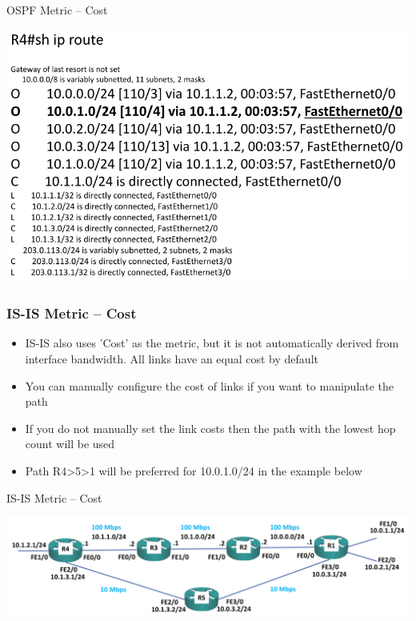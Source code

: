 \documentclass[pdflatex,compress,mathserif]{beamer}
\begin{document}
\begin{frame}{OSPF Metric – Cost}
	\begin{center}
		\includegraphics[width=\linewidth]{img/img20}
	\end{center}
\end{frame}

\begin{frame}
	\frametitle{IS-IS Metric – Cost}
	\begin{itemize}
		\item IS-IS also uses 'Cost' as the metric, but it is not automatically derived from interface bandwidth. All links have an equal cost by default
		\item You can manually configure the cost of links if you want to manipulate the path
		\item If you do not manually set the link costs then the path with the lowest hop
count will be used
		\item Path R4>5>1 will be preferred for 10.0.1.0/24 in the example below
	\end{itemize}
\end{frame}

\begin{frame}{IS-IS Metric – Cost}
	\begin{center}
		\includegraphics[width=\linewidth]{img/img21}
	\end{center}
\end{frame}
\end{document}
